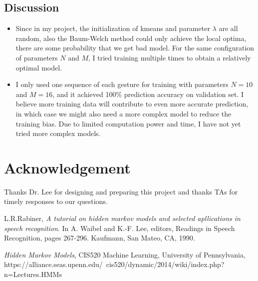 \documentclass[english]{article}
\begin{document}
\subsection {Discussion}
\begin{itemize}
\item Since in my project, the initialization of kmeans and parameter $\lambda$ are all random, also the 
Baum-Welch method could only achieve the local optima, there are some probability that we get bad model.
For the same configuration of parameters $N$ and $M$, I tried training multiple times to obtain a relatively optimal model.
\item I only used one sequence of each gesture for training with parameters $N=10$ and $M =16$, and it achieved 100\% prediction accuracy on validation set. I believe more training data will contribute to even more accurate prediction, in which case we might also need a more complex model to reduce the training bias. Due to limited computation power and time, I have not yet tried more complex models. 
\end{itemize}



\section {Acknowledgement}
Thanks Dr. Lee for designing and preparing this project and thanks TAs for timely responses to our questions.



\begin{thebibliography}{2} %

L.R.Rabiner, \emph{A tutorial on hidden markov models and selected apllications in speech recognition}. In A. Waibel and K.-F. Lee, editors, Readings in Speech Recognition, pages 267-296. Kaufmann, San Mateo, CA, 1990.

\emph{Hidden Markov Models}, CIS520 Machine Learning, University of Pennsylvania, https://alliance.seas.upenn.edu/~cis520/dynamic/2014/wiki/index.php?n=Lectures.HMMs


\end{thebibliography}
\end{document}
